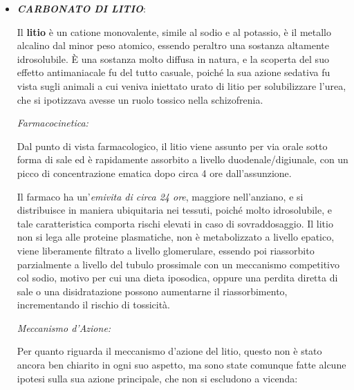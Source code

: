 \begin{itemize}
\item
  \textbf{\emph{CARBONATO DI LITIO}}:

Il \textbf{litio} è un catione monovalente, simile al sodio e al
potassio, è il metallo alcalino dal minor peso atomico, essendo peraltro
una sostanza altamente idrosolubile. È una sostanza molto diffusa in
natura, e la scoperta del suo effetto antimaniacale fu del tutto
casuale, poiché la sua azione sedativa fu vista sugli animali a cui
veniva iniettato urato di litio per solubilizzare l'urea, che si
ipotizzava avesse un ruolo tossico nella schizofrenia.

\emph{\emph{Farmacocinetica:}}

Dal punto di vista farmacologico, il litio viene assunto per via orale
sotto forma di sale ed è rapidamente assorbito a livello
duodenale/digiunale, con un picco di concentrazione ematica dopo circa 4
ore dall'assunzione.

Il farmaco ha un'\emph{emivita di circa 24 ore}, maggiore nell'anziano,
e si distribuisce in maniera ubiquitaria nei tessuti, poiché molto
idrosolubile, e tale caratteristica comporta rischi elevati in caso di
sovraddosaggio. Il litio non si lega alle proteine plasmatiche, non è
metabolizzato a livello epatico, viene liberamente filtrato a livello
glomerulare, essendo poi riassorbito parzialmente a livello del tubulo
prossimale con un meccanismo competitivo col sodio, motivo per cui una
dieta iposodica, oppure una perdita diretta di sale o una disidratazione
possono aumentarne il riassorbimento, incrementando il rischio di
tossicità.

\emph{\emph{Meccanismo d'Azione:}}

Per quanto riguarda il meccanismo d'azione del litio, questo non è stato
ancora ben chiarito in ogni suo aspetto, ma sono state comunque fatte
alcune ipotesi sulla sua azione principale, che non si escludono a
vicenda:


\end{itemize}
